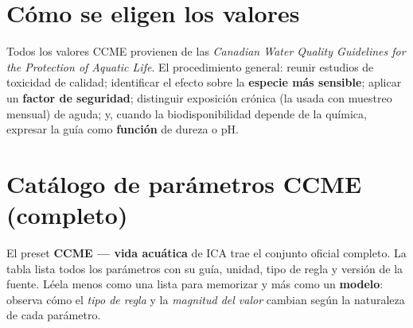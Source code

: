 \documentclass[11pt,a4paper]{article}
\begin{document}
\section{Cómo se eligen los valores}
Todos los valores CCME provienen de las \emph{Canadian Water Quality Guidelines for the Protection of
Aquatic Life}. El procedimiento general: reunir estudios de toxicidad de calidad; identificar el efecto
sobre la \textbf{especie más sensible}; aplicar un \textbf{factor de seguridad}; distinguir exposición
crónica (la usada con muestreo mensual) de aguda; y, cuando la biodisponibilidad depende de la química,
expresar la guía como \textbf{función} de dureza o pH.

\section{Catálogo de parámetros CCME (completo)}
El preset \textbf{CCME — vida acuática} de ICA trae el conjunto oficial completo. La tabla lista todos
los parámetros con su guía, unidad, tipo de regla y versión de la fuente. Léela menos como una lista
para memorizar y más como un \textbf{modelo}: observa cómo el \emph{tipo de regla} y la \emph{magnitud
del valor} cambian según la naturaleza de cada parámetro.
\end{document}
